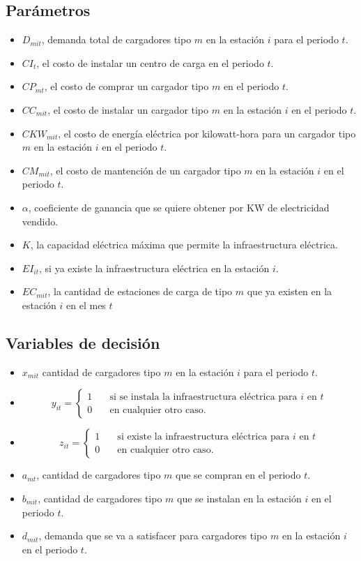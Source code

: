 \documentclass[letterpaper]{article}
\begin{document}
\begin{flushleft}
		\subsection{Parámetros}
		\begin{itemize}
			\item $D_{mit}$, demanda total de cargadores tipo $m$ en la estación $i$ para el periodo $t$.
			\item $CI_{t}$, el costo de instalar un centro de carga en el periodo $t$.
			\item $CP_{mt}$, el costo de comprar un cargador tipo $m$ en el periodo $t$.
			\item $CC_{mit}$, el costo de instalar un cargador tipo $m$ en la estación $i$ en el periodo $t$.
			\item $CKW_{mit}$, el costo de energía eléctrica por kilowatt-hora para un cargador tipo $m$ en la estación $i$ en el periodo $t$.
			\item $CM_{mit}$, el costo de mantención de un cargador tipo $m$ en la estación $i$ en el periodo $t$.
			\item $\alpha$, coeficiente de ganancia que se quiere obtener por KW de electricidad vendido.
			\item $K$, la capacidad eléctrica máxima que permite la infraestructura eléctrica.
			\item $EI_{it}$, si ya existe la infraestructura eléctrica en la estación $i$.
			\item $EC_{mit}$, la cantidad de estaciones de carga de tipo $m$ que ya existen en la estación $i$ en el mes $t$
		\end{itemize}
		\subsection{Variables de decisión} 
		\begin{itemize}
			\item $x_{mit}$ cantidad de cargadores tipo $m$ en la estación $i$ para el periodo $t$.
			\item \[
				y_{it} = 
					 \begin{cases}
					   1 &\quad\text{si se instala la infraestructura eléctrica para }i\text{ en }t\\
					   0 &\quad\text{en cualquier otro caso.}
					 \end{cases}
				\]
			\item \[
				z_{it} = 
						\begin{cases}
						1 &\quad\text{si existe la infraestructura eléctrica para }i\text{ en }t\\
						0 &\quad\text{en cualquier otro caso.}
						\end{cases}
				\]
			\item $a_{mt}$, cantidad de cargadores tipo $m$ que se compran en el periodo $t$.
			\item $b_{mit}$, cantidad de cargadores tipo $m$ que se instalan en la estación $i$ en el periodo $t$.
			\item $d_{mit}$, demanda que se va a satisfacer para cargadores tipo $m$ en la estación $i$ en el periodo $t$.
		\end{itemize}

\end{flushleft}
\end{document}
